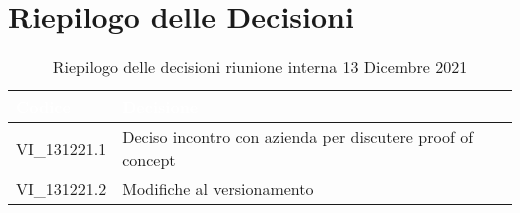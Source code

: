 \section{Riepilogo delle Decisioni}


\begin{table}[!htbp]
\renewcommand{\arraystretch}{1.5}
\begin{tabular}{m{}<{\centering}  m{}<{\centering}}
\rowcolor{darkblue} \textcolor{white}{\textbf{Codice}} & \textcolor{white}{\textbf{Decisione}} \\
\hline
VI\_131221.1 & Deciso incontro con azienda per discutere proof of concept \\
\rowcolor{gray!10} VI\_131221.2 & Modifiche al versionamento \\
\end{tabular}
\caption{Riepilogo delle decisioni riunione interna 13 Dicembre 2021}
\end{table}